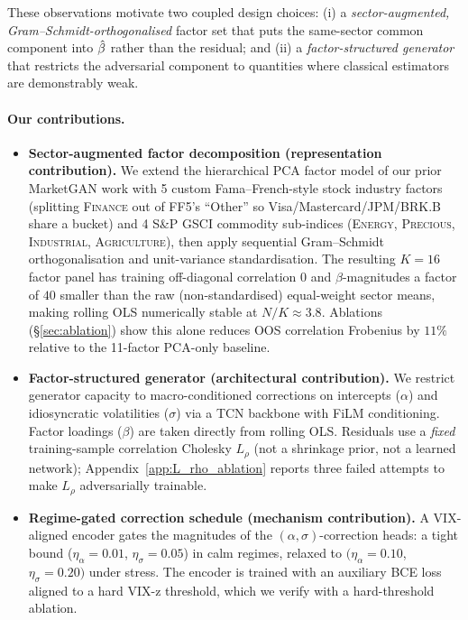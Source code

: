 These observations motivate two coupled design choices: (i) a \emph{sector-augmented, Gram--Schmidt-orthogonalised} factor set that puts the same-sector common component into $\hat{\beta}$ rather than the residual; and (ii) a \emph{factor-structured generator} that restricts the adversarial component to quantities where classical estimators are demonstrably weak.

\paragraph{Our contributions.}
\begin{itemize}
    \item \textbf{Sector-augmented factor decomposition (representation contribution).}
    We extend the hierarchical PCA factor model of our prior MarketGAN work with 5 custom Fama--French-style stock industry factors (splitting \textsc{Finance} out of FF5's ``Other'' so Visa/Mastercard/JPM/BRK.B share a bucket) and 4 S\&P GSCI commodity sub-indices (\textsc{Energy}, \textsc{Precious}, \textsc{Industrial}, \textsc{Agriculture}), then apply sequential Gram--Schmidt orthogonalisation and unit-variance standardisation. The resulting $K=16$ factor panel has training off-diagonal correlation $0$ and $\beta$-magnitudes a factor of $40$ smaller than the raw (non-standardised) equal-weight sector means, making rolling OLS numerically stable at $N/K \approx 3.8$. Ablations (\S\ref{sec:ablation}) show this alone reduces OOS correlation Frobenius by $11\%$ relative to the 11-factor PCA-only baseline.

    \item \textbf{Factor-structured generator (architectural contribution).}
    We restrict generator capacity to macro-conditioned corrections on intercepts ($\alpha$) and idiosyncratic volatilities ($\sigma$) via a TCN backbone with FiLM conditioning. Factor loadings ($\beta$) are taken directly from rolling OLS. Residuals use a \emph{fixed} training-sample correlation Cholesky $L_\rho$ (not a shrinkage prior, not a learned network); Appendix~\ref{app:L_rho_ablation} reports three failed attempts to make $L_\rho$ adversarially trainable.

    \item \textbf{Regime-gated correction schedule (mechanism contribution).}
    A VIX-aligned encoder gates the magnitudes of the $(\alpha, \sigma)$-correction heads: a tight bound ($\eta_\alpha = 0.01$, $\eta_\sigma = 0.05$) in calm regimes, relaxed to $(\eta_\alpha = 0.10$, $\eta_\sigma = 0.20)$ under stress. The encoder is trained with an auxiliary BCE loss aligned to a hard VIX-z threshold, which we verify with a hard-threshold ablation.


\end{itemize}
